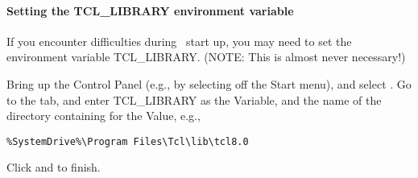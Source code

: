 \paragraph{Setting the TCL\_LIBRARY environment variable}

If you encounter difficulties during \OOMMF\ start up, you may need to set
the environment variable 
TCL\_LIBRARY.  (NOTE: This
is almost never necessary!)

Bring up the Control Panel (e.g., by selecting 
 off the Start menu), and select 
.  Go to the  tab, and enter
TCL\_LIBRARY as the Variable, and the name of the directory containing
 for the Value, e.g.,
\begin{verbatim}
%SystemDrive%\Program Files\Tcl\lib\tcl8.0
\end{verbatim}
Click  and  to finish.



